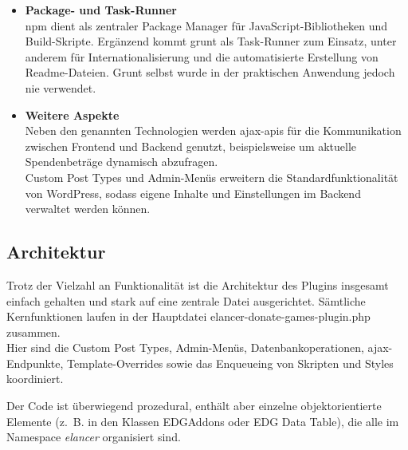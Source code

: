\begin{itemize}
    \item \textbf{Package- und Task-Runner}\\
    \gls{npm} dient als zentraler Package Manager für JavaScript-Bibliotheken und Build-Skripte.
    Ergänzend kommt \gls{grunt} als Task-Runner zum Einsatz, unter anderem für Internationalisierung und die automatisierte Erstellung von Readme-Dateien.
    Grunt selbst wurde in der praktischen Anwendung jedoch nie verwendet.

    \item \textbf{Weitere Aspekte}\\
    Neben den genannten Technologien werden \gls{ajax}-\gls{api}s für die Kommunikation zwischen Frontend und Backend genutzt, beispielsweise um aktuelle Spendenbeträge dynamisch abzufragen.\\
    Custom Post Types und Admin-Menüs erweitern die Standardfunktionalität von WordPress, sodass eigene Inhalte und Einstellungen im Backend verwaltet werden können.
\end{itemize}
\subsection{Architektur}

Trotz der Vielzahl an Funktionalität ist die Architektur des Plugins insgesamt einfach gehalten und stark auf eine zentrale Datei ausgerichtet.
Sämtliche Kernfunktionen laufen in der Hauptdatei elancer-donate-games-plugin.php zusammen.\\
Hier sind die Custom Post Types, Admin-Menüs, Datenbankoperationen, \gls{ajax}-Endpunkte, Template-Overrides sowie das Enqueueing von Skripten und Styles koordiniert.

Der Code ist überwiegend prozedural, enthält aber einzelne objektorientierte Elemente (z.~B. in den Klassen EDGAddons oder EDG Data Table), die alle im Namespace \emph{elancer} organisiert sind.

